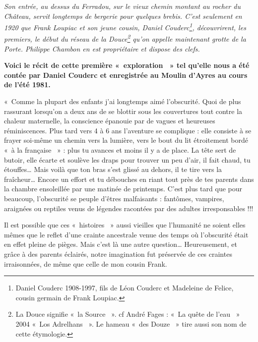 



\textit{Son entrée, au dessus du Ferradou, sur le vieux chemin montant au rocher du Château, servit longtemps de bergerie pour quelques brebis. C’est seulement en 1920 que Frank Loupiac et son jeune cousin, Daniel Couderc\footnote{Daniel Couderc 1908-1997, fils de Léon Couderc et Madeleine de Felice, cousin germain de Frank Loupiac.}, découvrirent, les premiers, le début du réseau de la Douce\footnote{La Douce signifie «~la Source ~». cf André Fages : «~La quête de l’eau ~» 2004 «~Los Adrelhans ~». Le hameau «~des Douze ~» tire aussi son nom de cette étymologie.} qu’on appelle maintenant grotte de la Porte. Philippe Chambon en est propriétaire et dispose des clefs.}

\vspace{1em}

\textbf{Voici le récit de cette première «~exploration ~» tel qu’elle nous a été contée par Daniel
Couderc et enregistrée au Moulin d’Ayres au cours de l’été 1981.}

\vspace{1em}

«~Comme la plupart des enfants j’ai longtemps aimé l’obscurité. Quoi de plus rassurant
lorsqu’on a deux ans de se blottir sous les couvertures tout contre la chaleur maternelle, la
conscience épanouie par de vagues et heureuses réminiscences. Plus tard vers 4 à 6
ans l’aventure se complique : elle consiste à se frayer soi-même un chemin vers la lumière,
vers le bout du lit étroitement bordé «~à la française ~» : plus tu avances et moins il y a de
place. La tête sert de butoir, elle écarte et soulève les draps pour trouver un peu d’air, il fait
chaud, tu étouffes… Mais voilà que ton bras s’est glissé au dehors, il te tire vers la fraîcheur…
Encore un effort et tu débouches en riant tout près de tes parents dans la chambre ensoleillée
par une matinée de printemps. C’est plus tard que pour beaucoup, l’obscurité se peuple d’êtres
malfaisants : fantômes, vampires, araignées ou reptiles venus de légendes racontées par des
adultes irresponsables !!!

Il est possible que ces «~histoires ~» aussi vieilles que l’humanité ne soient elles mêmes que le
reflet d’une crainte ancestrale venue des temps où l’obscurité était en effet pleine de pièges.
Mais c’est là une autre question…
Heureusement, et grâce à des parents éclairés, notre imagination fut préservée de ces craintes
irraisonnées, de même que celle de mon cousin Frank.

